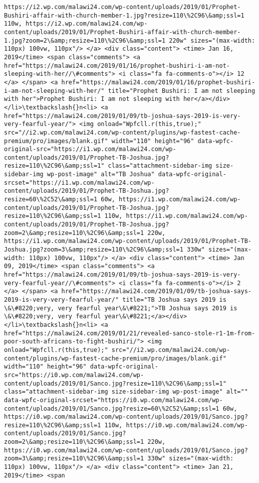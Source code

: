 \documentclass[11pt]{article}
\begin{document}
\begin{Verbatim}[commandchars=\\\{\}]
https://i2.wp.com/malawi24.com/wp-content/uploads/2019/01/Prophet-Bushiri-affair-with-church-member-1.jpg?resize=110\%2C96\&amp;ssl=1 110w, https://i2.wp.com/malawi24.com/wp-content/uploads/2019/01/Prophet-Bushiri-affair-with-church-member-1.jpg?zoom=2\&amp;resize=110\%2C96\&amp;ssl=1 220w" sizes="(max-width: 110px) 100vw, 110px"/> </a> <div class="content"> <time> Jan 16, 2019</time> <span class="comments"> <a href="https://malawi24.com/2019/01/16/prophet-bushiri-i-am-not-sleeping-with-her//\#comments"> <i class="fa fa-comments-o"></i> 12 </a> </span> <a href="https://malawi24.com/2019/01/16/prophet-bushiri-i-am-not-sleeping-with-her/" title="Prophet Bushiri: I am not sleeping with her">Prophet Bushiri: I am not sleeping with her</a></div></li>\textbackslash{}n<li> <a href="https://malawi24.com/2019/01/09/tb-joshua-says-2019-is-very-very-fearful-year/"> <img onload="Wpfcll.r(this,true);" src="//i2.wp.com/malawi24.com/wp-content/plugins/wp-fastest-cache-premium/pro/images/blank.gif" width="110" height="96" data-wpfc-original-src="https://i1.wp.com/malawi24.com/wp-content/uploads/2019/01/Prophet-TB-Joshua.jpg?resize=110\%2C96\&amp;ssl=1" class="attachment-sidebar-img size-sidebar-img wp-post-image" alt="TB Joshua" data-wpfc-original-srcset="https://i1.wp.com/malawi24.com/wp-content/uploads/2019/01/Prophet-TB-Joshua.jpg?resize=60\%2C52\&amp;ssl=1 60w, https://i1.wp.com/malawi24.com/wp-content/uploads/2019/01/Prophet-TB-Joshua.jpg?resize=110\%2C96\&amp;ssl=1 110w, https://i1.wp.com/malawi24.com/wp-content/uploads/2019/01/Prophet-TB-Joshua.jpg?zoom=2\&amp;resize=110\%2C96\&amp;ssl=1 220w, https://i1.wp.com/malawi24.com/wp-content/uploads/2019/01/Prophet-TB-Joshua.jpg?zoom=3\&amp;resize=110\%2C96\&amp;ssl=1 330w" sizes="(max-width: 110px) 100vw, 110px"/> </a> <div class="content"> <time> Jan 09, 2019</time> <span class="comments"> <a href="https://malawi24.com/2019/01/09/tb-joshua-says-2019-is-very-very-fearful-year//\#comments"> <i class="fa fa-comments-o"></i> 2 </a> </span> <a href="https://malawi24.com/2019/01/09/tb-joshua-says-2019-is-very-very-fearful-year/" title="TB Joshua says 2019 is \&\#8220;very, very fearful year\&\#8221;">TB Joshua says 2019 is \&\#8220;very, very fearful year\&\#8221;</a></div></li>\textbackslash{}n<li> <a href="https://malawi24.com/2019/01/21/revealed-sanco-stole-r1-1m-from-poor-south-africans-to-fight-bushiri/"> <img onload="Wpfcll.r(this,true);" src="//i2.wp.com/malawi24.com/wp-content/plugins/wp-fastest-cache-premium/pro/images/blank.gif" width="110" height="96" data-wpfc-original-src="https://i0.wp.com/malawi24.com/wp-content/uploads/2019/01/Sanco.jpg?resize=110\%2C96\&amp;ssl=1" class="attachment-sidebar-img size-sidebar-img wp-post-image" alt="" data-wpfc-original-srcset="https://i0.wp.com/malawi24.com/wp-content/uploads/2019/01/Sanco.jpg?resize=60\%2C52\&amp;ssl=1 60w, https://i0.wp.com/malawi24.com/wp-content/uploads/2019/01/Sanco.jpg?resize=110\%2C96\&amp;ssl=1 110w, https://i0.wp.com/malawi24.com/wp-content/uploads/2019/01/Sanco.jpg?zoom=2\&amp;resize=110\%2C96\&amp;ssl=1 220w, https://i0.wp.com/malawi24.com/wp-content/uploads/2019/01/Sanco.jpg?zoom=3\&amp;resize=110\%2C96\&amp;ssl=1 330w" sizes="(max-width: 110px) 100vw, 110px"/> </a> <div class="content"> <time> Jan 21, 2019</time> <span 
\end{Verbatim}
\end{document}
